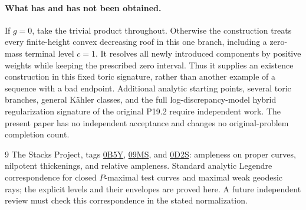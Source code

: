 \documentclass[11pt]{article}
\begin{document}
\paragraph{What has and has not been obtained.}
If $g=0$, take the trivial product throughout. Otherwise the
construction treats every finite-height convex decreasing roof in
this one branch, including a zero-mass terminal level $c=1$.
It resolves all newly introduced components by positive weights
while keeping the prescribed zero interval. Thus it supplies an
existence construction in this fixed toric signature, rather than
another example of a sequence with a bad endpoint. Additional
analytic starting points, several toric branches, general K\"ahler
classes, and the full log-discrepancy-model hybrid regularization
signature of the original P19.2 require independent work.
The present paper has no independent acceptance and changes no
original-problem completion count.

\begin{thebibliography}{9}
 The Stacks Project, tags
\href{https://stacks.math.columbia.edu/tag/0B5Y}{0B5Y},
\href{https://stacks.math.columbia.edu/tag/09MS}{09MS}, and
\href{https://stacks.math.columbia.edu/tag/0D2S}{0D2S}:
ampleness on proper curves, nilpotent thickenings, and relative ampleness.
 Standard analytic Legendre correspondence for closed
$P$-maximal test curves and maximal weak geodesic rays; the explicit
levels and their envelopes are proved here. A future independent
review must check this correspondence in the stated normalization.
\end{thebibliography}
\end{document}
